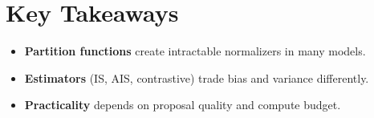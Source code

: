 
\section*{Key Takeaways}

\begin{itemize}[leftmargin=2em]
    \item \textbf{Partition functions} create intractable normalizers in many models.
    \item \textbf{Estimators} (IS, AIS, contrastive) trade bias and variance differently.
    \item \textbf{Practicality} depends on proposal quality and compute budget.
\end{itemize}


